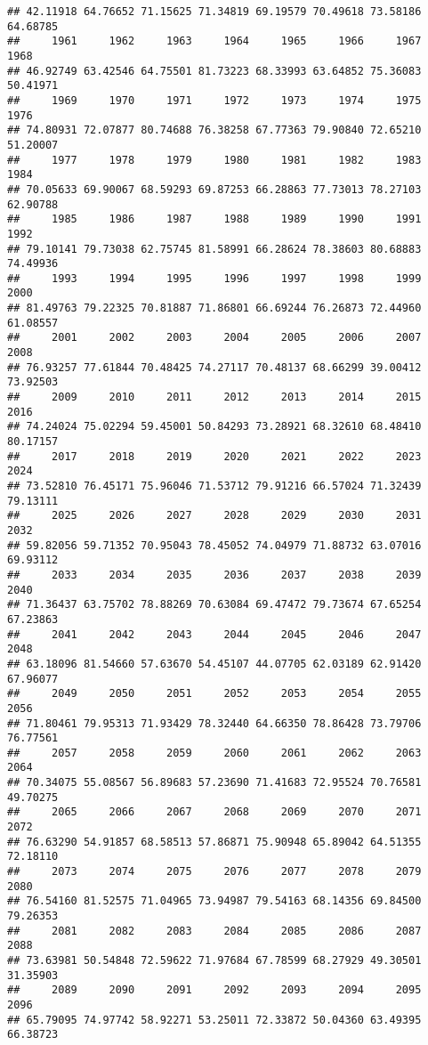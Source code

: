 \documentclass[
]{article}
\begin{document}
\begin{verbatim}
## 42.11918 64.76652 71.15625 71.34819 69.19579 70.49618 73.58186 64.68785 
##     1961     1962     1963     1964     1965     1966     1967     1968 
## 46.92749 63.42546 64.75501 81.73223 68.33993 63.64852 75.36083 50.41971 
##     1969     1970     1971     1972     1973     1974     1975     1976 
## 74.80931 72.07877 80.74688 76.38258 67.77363 79.90840 72.65210 51.20007 
##     1977     1978     1979     1980     1981     1982     1983     1984 
## 70.05633 69.90067 68.59293 69.87253 66.28863 77.73013 78.27103 62.90788 
##     1985     1986     1987     1988     1989     1990     1991     1992 
## 79.10141 79.73038 62.75745 81.58991 66.28624 78.38603 80.68883 74.49936 
##     1993     1994     1995     1996     1997     1998     1999     2000 
## 81.49763 79.22325 70.81887 71.86801 66.69244 76.26873 72.44960 61.08557 
##     2001     2002     2003     2004     2005     2006     2007     2008 
## 76.93257 77.61844 70.48425 74.27117 70.48137 68.66299 39.00412 73.92503 
##     2009     2010     2011     2012     2013     2014     2015     2016 
## 74.24024 75.02294 59.45001 50.84293 73.28921 68.32610 68.48410 80.17157 
##     2017     2018     2019     2020     2021     2022     2023     2024 
## 73.52810 76.45171 75.96046 71.53712 79.91216 66.57024 71.32439 79.13111 
##     2025     2026     2027     2028     2029     2030     2031     2032 
## 59.82056 59.71352 70.95043 78.45052 74.04979 71.88732 63.07016 69.93112 
##     2033     2034     2035     2036     2037     2038     2039     2040 
## 71.36437 63.75702 78.88269 70.63084 69.47472 79.73674 67.65254 67.23863 
##     2041     2042     2043     2044     2045     2046     2047     2048 
## 63.18096 81.54660 57.63670 54.45107 44.07705 62.03189 62.91420 67.96077 
##     2049     2050     2051     2052     2053     2054     2055     2056 
## 71.80461 79.95313 71.93429 78.32440 64.66350 78.86428 73.79706 76.77561 
##     2057     2058     2059     2060     2061     2062     2063     2064 
## 70.34075 55.08567 56.89683 57.23690 71.41683 72.95524 70.76581 49.70275 
##     2065     2066     2067     2068     2069     2070     2071     2072 
## 76.63290 54.91857 68.58513 57.86871 75.90948 65.89042 64.51355 72.18110 
##     2073     2074     2075     2076     2077     2078     2079     2080 
## 76.54160 81.52575 71.04965 73.94987 79.54163 68.14356 69.84500 79.26353 
##     2081     2082     2083     2084     2085     2086     2087     2088 
## 73.63981 50.54848 72.59622 71.97684 67.78599 68.27929 49.30501 31.35903 
##     2089     2090     2091     2092     2093     2094     2095     2096 
## 65.79095 74.97742 58.92271 53.25011 72.33872 50.04360 63.49395 66.38723 

\end{verbatim}
\end{document}
